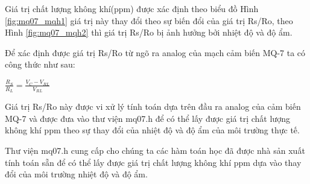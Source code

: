 Giá trị chất lượng không khí(ppm) được xác định theo biểu đồ Hình \ref{fig:mq07_mqh1} giá trị này thay đổi theo sự biến đổi của giá trị Rs/Ro, theo Hình \ref{fig:mq07_mqh2} thì giá trị Rs/Ro bị ảnh hưởng bởi nhiệt độ và độ ẩm.

Để xác định được giá trị Rs/Ro từ ngõ ra analog của mạch cảm biến MQ-7 ta có công thức như sau:
\begin{center}
$\displaystyle \frac{R_{S}}{R_{L}} = \frac{V_{C}-V_{RL}}{V_{RL}}$
\end{center}

Giá trị Rs/Ro này được vi xử lý tính toán dựa trên đầu ra analog của cảm biến MQ-7 và được đưa vào thư viện mq07.h để có thể lấy được giá trị chất lượng không khí ppm theo sự thay đổi của nhiệt độ và độ ẩm của môi trường thực tế.

Thư viện mq07.h cung cấp cho chúng ta các hàm toán học đã được nhà sản xuất tính toán sẵn để có thể lấy được giá trị chất lượng không khí ppm dựa vào thay đổi của môi trường nhiệt độ và độ ẩm.






\newpage
